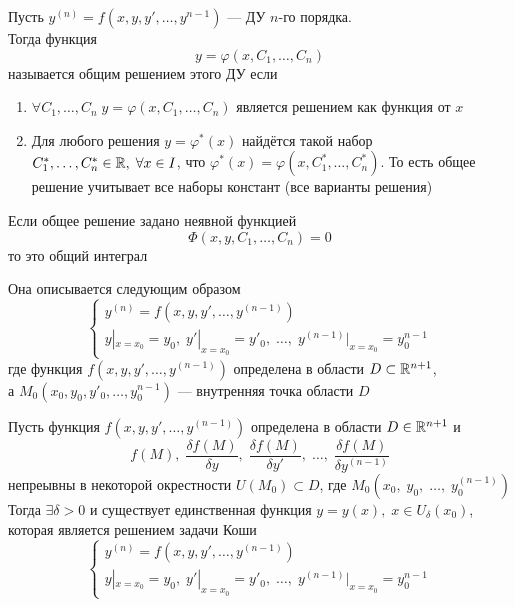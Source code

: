 \begin{Def}
    Пусть $y^{(n)} = f(x, y, y', \dots, y^{n-1})$ --- ДУ $n$-го порядка.\\
    Тогда функция 
    \[
        y = \varphi(x, C_1, \dots, C_n)
    \]
    называется общим решением этого ДУ если
    \begin{enumerate}
        \item $\forall C_1, \dots, C_n \; y = \varphi(x, C_1, \dots, C_n)$ является решением как функция от $x$
        \item Для любого решения $y = \varphi^*(x)$ найдётся такой набор $C^*_1, \dots, C^*_n \in \mathbb{R},\; \forall x \in I$, что $\varphi^*(x) = \varphi(x, C^*_1, \dots, C^*_n)$. То есть общее решение учитывает все наборы констант (все варианты решения)
    \end{enumerate}
\end{Def}

\begin{Def}
    Если общее решение задано неявной функцией
    \[
        \varPhi(x, y, C_1, \dots, C_n) = 0
    \]
    то это общий интеграл
\end{Def}

\begin{Def}
    Она описывается следующим образом
    \[
        \begin{cases}
            y^{(n)} = f(x, y, y', \dots, y^{(n-1)})\\
            y|_{x = x_0} = y_0, \; y'|_{x = x_0} = y'_0, \; \dots, \; y^{(n-1)}|_{x = x_0} = y^{n-1}_0
        \end{cases}
    \]
    где функция $f(x, y, y', \dots, y^{(n-1)})$ определена в области $D \subset \mathbb{R}^{n+1}$,\\
    а $M_0(x_0, y_0, y'_0, \dots, y^{n-1}_0)$ --- внутренняя точка области $D$
\end{Def}

\begin{Th}
    Пусть функция $f(x, y, y', \dots, y^{(n - 1)})$ определена в области $D \in \mathbb{R}^{n+1}$ и
    \[
        f(M), \; \frac{\delta f(M)}{\delta y}, \; \frac{\delta f(M)}{\delta y'}, \; \dots, \; \frac{\delta f(M)}{\delta y^{(n-1)}}
    \]
    непреывны в некоторой окрестности $U(M_0) \subset D$, где $M_0(x_0,\; y_0,\; \dots,\; y_0^{(n-1)})$\\
    
    Тогда $\exists \delta > 0$ и существует единственная функция $y = y(x), \; x \in U_\delta(x_0)$, которая является решением задачи Коши
    \[
        \begin{cases}
            y^{(n)} = f(x, y, y', \dots, y^{(n-1)})\\
            y|_{x = x_0} = y_0, \; y'|_{x = x_0} = y'_0, \; \dots, \;   y^{(n-1)}|_{x = x_0} = y^{n-1}_0
        \end{cases}
    \] 
\end{Th}

